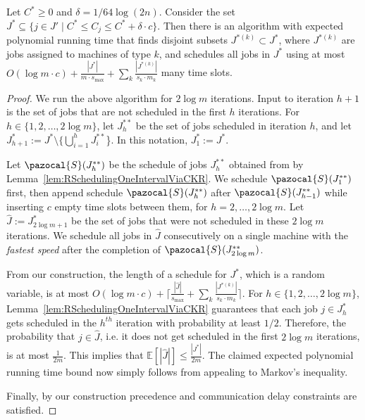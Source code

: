   \begin{lemma} \label{lem: FullSchedulingOneIntervalViaCKRForRelated}
    Let $C^* \geq 0$ and $\delta = 1/64\log(2n)$. 
  Consider the set $J^* \subseteq \{ j \in J' \mid C^* \leq C_j \leq C^*+\delta \cdot c\}$.
    Then there is an algorithm with expected polynomial running time that finds disjoint subsets  $J^{*(k)} \subset J^*$, 
    where $J^{*(k)}$ are jobs assigned to machines of type $k$, 
    and schedules all jobs in $J^*$ using at most $O(\log m \cdot c ) + \frac{|J^*|}{m\cdot s_{\max}}+\sum_k \frac{|J^{*(k)}|}{s_k \cdot m_k}$ many time slots.
  \end{lemma}
  
  \begin{proof}
  We run the above algorithm for $2 \log m$ iterations. Input to iteration $h+1$ is the set of jobs that are not scheduled in the first $h$ iterations. 
  For $h \in \{1,2,\ldots, 2 \log m \}$, let $J^{**}_{h}$ be the set of jobs scheduled in iteration $h$, and let $J^*_{h+1} := J^* \setminus \{ \bigcup^{h}_{i = 1} J^{**}_i$\}.
   In this notation,  $J^*_1 := J^*$.
  
   Let $\pazocal{S}(J^{**}_{h})$ be the schedule of jobs $J^{**}_{h}$ obtained from by Lemma~\ref{lem:RSchedulingOneIntervalViaCKR}.
    We schedule $\pazocal{S}(J^{**}_1)$ first, then append schedule $\pazocal{S}(J^{**}_{h})$ after $\pazocal{S}(J^{**}_{h-1})$ while inserting $c$ empty time slots between them, for $h = 2,\ldots, 2 \log m$.
   Let $\hat{J} := J^{*}_{2\log m +1}$ be the set of jobs that were not scheduled in these $2\log m$ iterations.
   We schedule all jobs in $\hat{J}$ consecutively on a single machine with the {\em fastest speed} after the completion of $\pazocal{S}(J^{**}_{2 \log m})$.
   
   From our construction, the length of a schedule for  $J^*$, which is a random variable, is at most $O(\log m \cdot c) +  \lceil \frac{|\hat{J}|}{s_{\max}} +\sum_k \frac{|J^{*(k)}|}{s_k \cdot m_k} \rceil$.
   For $h \in \{ 1,2, \ldots ,2\log m\}$,  Lemma~\ref{lem:RSchedulingOneIntervalViaCKR}  guarantees that each job $j \in J^*_{h}$ gets scheduled in the $h^{th}$ iteration with probability at least $1/2$.
   Therefore, the probability that $j \in \hat{J}$,  i.e. it does not get scheduled in the first $2 \log m$ iterations, is at most $\frac{1}{2m}$.
   This implies that $\mathbb{E}[|\hat{J}|] \leq \frac{|J^*|} {2m}$.
   The claimed expected polynomial running time bound now simply follows from appealing to Markov's inequality. 
  
   
   Finally, by our construction precedence and communication delay constraints are satisfied.
  \end{proof}
  
